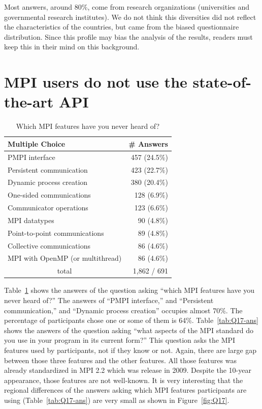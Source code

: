 \documentclass[sigconf,nonacm]{acmart}
\begin{document}
Most answers, around 80\%, come from research organizations
(universities and governmental research institutes).  We do not think this
diversities did not reflect the characteristics of the countries, but
came from the biased questionnaire distribution. 
Since this profile may bias the analysis of the results, 
readers must keep this in their mind on this background.

\section{MPI users do not use the state-of-the-art API}

{\small
\begin{table}[htb]%
\begin{center}%
\caption{Which MPI features have you never heard of?}%
\label{tab:Q16-ans}%
\begin{tabular}{l|r}%
\hline%
Multiple Choice & \# Answers \\%
\hline%
PMPI interface & 457 (24.5\%) \\%
Persistent communication & 423 (22.7\%) \\%
Dynamic process creation & 380 (20.4\%) \\%
One-sided communications & 128 (6.9\%) \\%
Communicator operations & 123 (6.6\%) \\%
MPI datatypes & 90 (4.8\%) \\%
Point-to-point communications & 89 (4.8\%) \\%
Collective communications & 86 (4.6\%) \\%
MPI with OpenMP (or multithread) & 86 (4.6\%) \\%
\hline%
\multicolumn{1}{c}{total} & 1,862 / 691 \\%
\hline%
\end{tabular}%
\end{center}%
\end{table}%
}

Table~\ref{tab:Q16-ans} shows the answers of the question asking
``which MPI features have you never heard of?'' The answers of ``PMPI
interface,'' and ``Persistent communication,'' and ``Dynamic process
creation'' occupies almost 70\%.  The percentage of participants chose
one or some of them is 64\%.  
Table~\ref{tab:Q17-ans} shows the answers of the question asking
``what aspects of the MPI standard do you use in your program in its
current form?'' This question asks the MPI features used by
participants, not if they know or not. Again, there are large gap
between those three features and the other features.
All those features was already standardized in MPI 2.2 which was
release in 2009. Despite the 10-year appearance, those features are
not well-known. 
It is very interesting that the regional differences of the answers
asking which MPI features participants are using
(Table~\ref{tab:Q17-ans}) are very small as shown in
Figure~\ref{fig:Q17}. 
\end{document}
